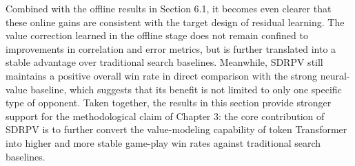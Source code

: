 Combined with the offline results in Section 6.1, it becomes even clearer that these online gains are consistent with the target design of residual learning. The value correction learned in the offline stage does not remain confined to improvements in correlation and error metrics, but is further translated into a stable advantage over traditional search baselines. Meanwhile, SDRPV still maintains a positive overall win rate in direct comparison with the strong neural-value baseline, which suggests that its benefit is not limited to only one specific type of opponent. Taken together, the results in this section provide stronger support for the methodological claim of Chapter 3: the core contribution of SDRPV is to further convert the value-modeling capability of token Transformer into higher and more stable game-play win rates against traditional search baselines.


